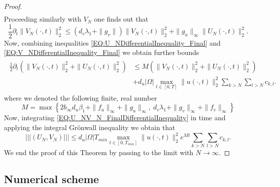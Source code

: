 \documentclass[12pt, a4paper]{article}
\theoremstyle{break}
\theoremstyle{break}
\theoremstyle{break}
\theoremstyle{break}
\theoremstyle{break}
\theoremstyle{break}
\theoremstyle{break}
\begin{document}
\begin{proof}
\begin{align}
    \end{align}
    Proceeding similarly with $V_N$ one finds out that
    \begin{equation}
        \label{EQ:V_NDifferentialInequality_Final}
            \frac{1}{2}\partial_t\|V_N(\cdot, t)\|_2^2 \leq ( d_v \lambda_1 + \|g_v\| ) \|V_N(\cdot, t)\|_2^2 + \|g_u\|_\infty \|U_N(\cdot, t)\|_2^2.
    \end{equation}
    Now, combining inequalities \eqref{EQ:U_NDifferentialInequality_Final} and \eqref{EQ:V_NDifferentialInequality_Final} we obtain further bounds
    \begin{align}
        \label{EQ:U_NV_N_FinalDifferentialInequality}
        \begin{split}
            \frac{1}{2}\partial_t( \|V_N(\cdot, t)\|_2^2 + \|U_N(\cdot, t)\|_2^2 )
            &\leq M ( \|V_N(\cdot, t)\|_2^2 + \|U_N(\cdot, t)\|_2^2 ) \\
            &+ d_u |\Omega| \max_{t \in [0, T]}\|u(\cdot, t)\|_2^2 \sum_{k > N}\sum_{l > N} c_{k, l}.
        \end{split}
    \end{align}
    where we denoted the following finite, real number 
    $$M = \max\left\{ 2 b_\infty d_u \beta_1 + \|f_u\|_\infty + \|g_u\|_\infty,\: d_v \lambda_1 + \|g_v\|_\infty + \|f_v\|_\infty \right\}$$
    Now, integrating \eqref{EQ:U_NV_N_FinalDifferentialInequality} in time and applying the integral Gr\"onwall inequality we obtain that
    \begin{equation*}
        ||| (U_N, V_N) ||| \leq d_u |\Omega| T_{min} \max_{t \in [0, T_{min}]}\|u(\cdot, t)\|_2^2 e^{M t} \sum_{k > N}\sum_{l > N} c_{k, l}.
    \end{equation*}
    We end the proof of this Theorem by passing to the limit with $N \rightarrow \infty$.
\end{proof}

\subsection{Numerical scheme}
\end{document}
